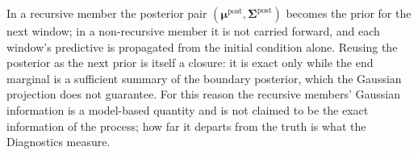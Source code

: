 In a recursive member the posterior pair $(\bm{\mu}^{\mathrm{post}}, \bm{\Sigma}^{\mathrm{post}})$
becomes the prior for the next window; in a non-recursive member it is not carried forward,
and each window's predictive is propagated from the initial condition alone. Reusing the
posterior as the next prior is itself a closure: it is exact only while the end marginal is
a sufficient summary of the boundary posterior, which the Gaussian projection does not
guarantee. For this reason the recursive members' Gaussian information is a model-based
quantity and is not claimed to be the exact information of the process; how far it departs
from the truth is what the Diagnostics measure.


